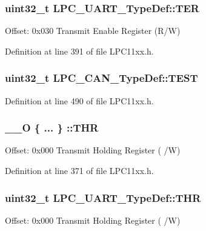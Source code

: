 \subsubsection[{\texorpdfstring{T\+ER}{TER}}]{ uint32\+\_\+t L\+P\+C\+\_\+\+U\+A\+R\+T\+\_\+\+Type\+Def\+::\+T\+ER}\hypertarget{group___l_p_c11xx___definitions_gab9eca1b8b66856a78a64820be99130e1}{}\label{group___l_p_c11xx___definitions_gab9eca1b8b66856a78a64820be99130e1}
Offset\+: 0x030 Transmit Enable Register (R/W) 

Definition at line 391 of file L\+P\+C11xx.\+h.

\subsubsection[{\texorpdfstring{T\+E\+ST}{TEST}}]{ uint32\+\_\+t L\+P\+C\+\_\+\+C\+A\+N\+\_\+\+Type\+Def\+::\+T\+E\+ST}\hypertarget{group___l_p_c11xx___definitions_gac41d8021c6279949be65ac66cb5d35d2}{}\label{group___l_p_c11xx___definitions_gac41d8021c6279949be65ac66cb5d35d2}


Definition at line 490 of file L\+P\+C11xx.\+h.

\subsubsection[{\texorpdfstring{T\+HR}{THR}}]{\setlength{\rightskip}{0pt plus 5cm}\+\_\+\+\_\+O \{ ... \} \+::T\+HR}\hypertarget{group___l_p_c11xx___definitions_ga77dcad06118093e5e6a8f3a71b86de84}{}\label{group___l_p_c11xx___definitions_ga77dcad06118093e5e6a8f3a71b86de84}
Offset\+: 0x000 Transmit Holding Register ( /W) 

Definition at line 371 of file L\+P\+C11xx.\+h.

\subsubsection[{\texorpdfstring{T\+HR}{THR}}]{ uint32\+\_\+t L\+P\+C\+\_\+\+U\+A\+R\+T\+\_\+\+Type\+Def\+::\+T\+HR}\hypertarget{group___l_p_c11xx___definitions_gab3343b931a2ef5cbcfa1a24aaca8ac95}{}\label{group___l_p_c11xx___definitions_gab3343b931a2ef5cbcfa1a24aaca8ac95}
Offset\+: 0x000 Transmit Holding Register ( /W) 

